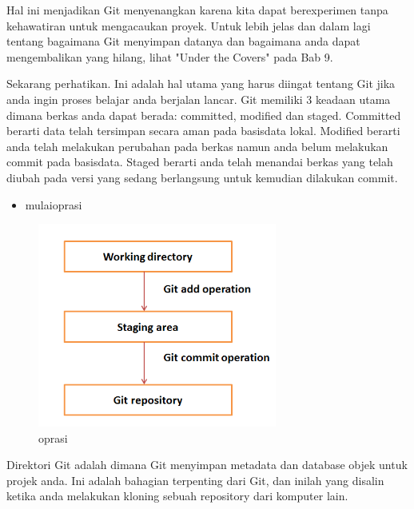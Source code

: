 {{\vspace{\baselineskip}
\noindent 
{\fontsize{14pt}{14pt}\selectfont Hal ini menjadikan Git menyenangkan karena kita dapat berexperimen tanpa kehawatiran untuk mengacaukan proyek. Untuk lebih jelas dan dalam lagi tentang bagaimana Git menyimpan datanya dan bagaimana anda dapat mengembalikan yang hilang, lihat "Under the Covers" pada Bab 9. \\} \par
\vspace{\baselineskip}

\noindent 
{\fontsize{14pt}{14pt}\selectfont Sekarang perhatikan. Ini adalah hal utama yang harus diingat tentang Git jika anda ingin proses belajar anda berjalan lancar. Git memiliki 3 keadaan utama dimana berkas anda dapat berada: committed, modified dan staged. Committed berarti data telah tersimpan secara aman pada basisdata lokal. Modified berarti anda telah melakukan perubahan pada berkas namun anda belum melakukan commit pada basisdata. Staged berarti anda telah menandai berkas yang telah diubah pada versi yang sedang berlangsung untuk kemudian dilakukan commit. \\} \par

\begin{itemize}
	\item mulaioprasi
\end{itemize}
\begin{figure}[ht]
	\centerline{\includegraphics[width=0.70\textwidth]{figures/mulaioprasi}}
	\caption{oprasi}
	\label{oprasi}
\end{figure}

\noindent 
{\fontsize{14pt}{14pt}\selectfont Direktori Git adalah dimana Git menyimpan metadata dan database objek untuk projek anda. Ini adalah bahagian terpenting dari Git, dan inilah yang disalin ketika anda melakukan kloning sebuah repository dari komputer lain. \\} \par

}}

